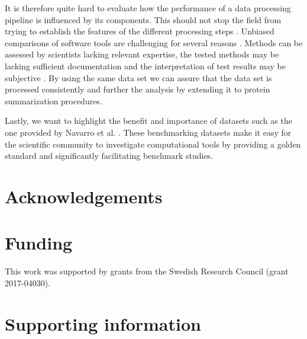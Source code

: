 \documentclass[10pt,letterpaper]{article}
\begin{document}
It is therefore quite hard to evaluate how the performance of a data processing pipeline is influenced by its components. This should not stop the field from trying to establish the features of the different processing steps \cite{dufresne2014abrf,gatto2016testing,navarro2016multicenter}. Unbiased comparisons of software tools are challenging for several reasons \cite{dufresne2014abrf}. Methods can be assessed by scientists lacking relevant expertise, the tested methods may be lacking sufficient documentation and the interpretation of test results may be subjective \cite{yates2012toward,leprevost2014best,pak2013clustering,faircomparison2015}. By using the same data set we can assure that the data set is processed consistently and further the analysis by extending it to protein summarization procedures.

Lastly, we want to highlight the benefit and importance of datasets such as the one provided by Navarro et al. \cite{navarro2016multicenter}. These benchmarking datasets make it easy for the scientific community to investigate computational tools by providing a golden standard and significantly facilitating benchmark studies. 

\section*{Acknowledgements}


\section*{Funding}

This work was supported by grants from the Swedish Research Council (grant 2017-04030).

\section*{Supporting information}


%

\end{document}
